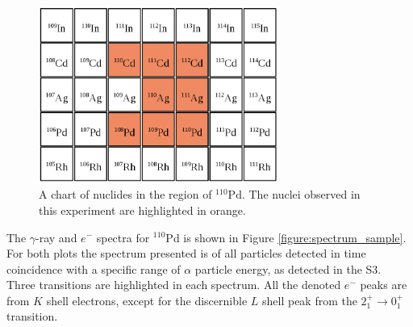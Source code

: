 \begin{figure}[!ht]
  \centering
  \includegraphics[width=0.7\textwidth]{techniques_chart_region.png}
  \caption[A chart of nuclides in the region of $^{110}\mathrm{Pd}$; highlighting the nuclei observed in the experiment.]{A chart of nuclides in the region of $^{110}\mathrm{Pd}$. The nuclei observed in this experiment are highlighted in orange.}
  \label{figure: nuclear chart region}
\end{figure}

The $\gamma$-ray and $e^-$ spectra for $^{110}$Pd is shown in Figure \ref{figure:spectrum_sample}. For both plots the spectrum presented is of all particles detected in time coincidence with a specific range of $\alpha$ particle energy, as detected in the S3. Three transitions are highlighted in each spectrum. All the denoted $e^-$ peaks are from $K$ shell electrons, except for the discernible $L$ shell peak from the $2^+_1 \rightarrow 0^+_1$ transition. 

